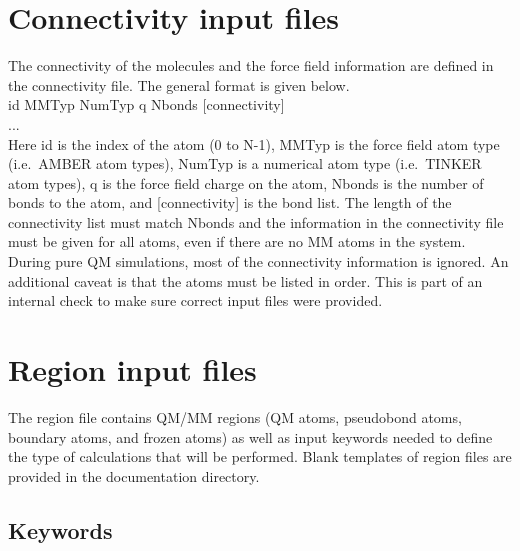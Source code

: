 \documentclass[12pt]{report}
\begin{document}
\section{Connectivity input files}

The connectivity of the molecules and the force field information are defined
in the connectivity file.
The general format is given below. \\

id MMTyp NumTyp q Nbonds [connectivity] \\
... \\

Here id is the index of the atom (0 to N-1), MMTyp is the force field atom
type (i.e.\ AMBER atom types), NumTyp is a numerical atom type (i.e.\ TINKER
atom types), q is the force field charge on the atom, Nbonds is the number of
bonds to the atom, and [connectivity] is the bond list.
The length of the connectivity list must match Nbonds and the information in
the connectivity file must be given for all atoms, even if there are no MM
atoms in the system.
During pure QM simulations, most of the connectivity information is ignored.
An additional caveat is that the atoms must be listed in order.
This is part of an internal check to make sure correct input files were
provided.
\newpage
\section{Region input files}

The region file contains QM/MM regions (QM atoms, pseudobond atoms, boundary
atoms, and frozen atoms) as well as input keywords needed to define the
type of calculations that will be performed.
Blank templates of region files are provided in the documentation
directory. \\

\subsection{Keywords}
\end{document}

